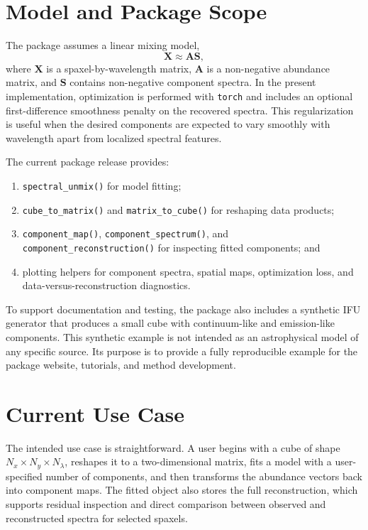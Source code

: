 \documentclass[rnaas]{aastex7}
\begin{document}
\section{Model and Package Scope}

The package assumes a linear mixing model,
\begin{equation}
\mathbf{X} \approx \mathbf{A}\mathbf{S},
\end{equation}
where $\mathbf{X}$ is a spaxel-by-wavelength matrix, $\mathbf{A}$ is a
non-negative abundance matrix, and $\mathbf{S}$ contains non-negative component
spectra. In the present implementation, optimization is performed with
\texttt{torch} \citep{Falbel2023} and includes an optional first-difference
smoothness penalty on the recovered spectra. This regularization is useful when
the desired components are expected to vary smoothly with wavelength apart from
localized spectral features.

The current package release provides:
\begin{enumerate}
\item \texttt{spectral\_unmix()} for model fitting;
\item \texttt{cube\_to\_matrix()} and \texttt{matrix\_to\_cube()} for reshaping
data products;
\item \texttt{component\_map()}, \texttt{component\_spectrum()}, and
\texttt{component\_reconstruction()} for inspecting fitted components; and
\item plotting helpers for component spectra, spatial maps, optimization loss,
and data-versus-reconstruction diagnostics.
\end{enumerate}

To support documentation and testing, the package also includes a synthetic IFU
generator that produces a small cube with continuum-like and emission-like
components. This synthetic example is not intended as an astrophysical model of
any specific source. Its purpose is to provide a fully reproducible example for
the package website, tutorials, and method development.

\section{Current Use Case}

The intended use case is straightforward. A user begins with a cube of shape
$N_x \times N_y \times N_\lambda$, reshapes it to a two-dimensional matrix,
fits a model with a user-specified number of components, and then transforms
the abundance vectors back into component maps. The fitted object also stores
the full reconstruction, which supports residual inspection and direct
comparison between observed and reconstructed spectra for selected spaxels.
\end{document}
